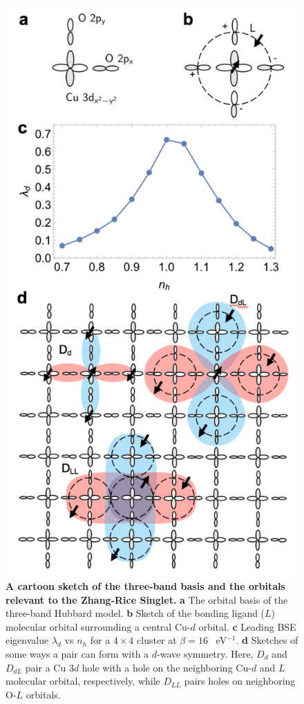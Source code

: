\documentclass[fleqn,twocolumn,11pt]{wlscirep}
\begin{document}
\begin{figure}[hbt!]
\centering
\includegraphics[width=\linewidth]{./Figures/Figure1.pdf}
\caption{{\bf A cartoon sketch of the three-band basis and the orbitals relevant to the Zhang-Rice Singlet.} {\bf a} The orbital basis of the three-band Hubbard model. {\bf b} Sketch of the bonding ligand ($L$) molecular orbital surrounding a central Cu-$d$ orbital. {\bf c} Leading BSE eigenvalue $\lambda_d$ vs $n_h$ for a $4\times4$ cluster at $\beta=16$ ~eV$^{-1}$. {\bf d} Sketches of some ways a pair can form with a $d$-wave symmetry.  Here, $D_{d}$ and $D_{dL}$ pair a Cu $3d$ hole with a hole on the neighboring Cu-$d$ and $L$ molecular orbital, respectively, while $D_{LL}$ pairs holes on neighboring O-$L$ orbitals.}
\label{Fig:PairStructure}
\end{figure}
\end{document}
